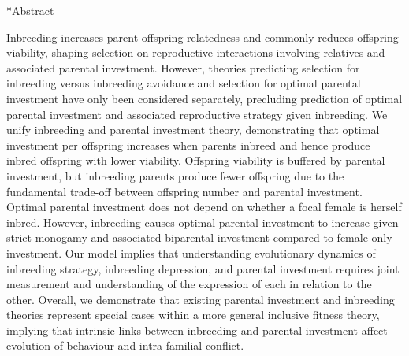 \documentclass[12pt]{article}
\makeatletter
\renewcommand\section{\@startsection{section}{1}{0in}{-0.5\baselineskip}{0.1\baselineskip}{\normalfont\large\bfseries}}
\makeatother
\begin{document}
\section*{Abstract} 

Inbreeding increases parent-offspring relatedness and commonly reduces offspring viability, shaping selection on reproductive interactions involving relatives and associated parental investment. However, theories predicting selection for inbreeding versus inbreeding avoidance and selection for optimal parental investment have only been considered separately, precluding prediction of optimal parental investment and associated reproductive strategy given inbreeding. We unify inbreeding and parental investment theory, demonstrating that optimal investment per offspring increases when parents inbreed and hence produce inbred offspring with lower viability. Offspring viability is buffered by parental investment, but inbreeding parents produce fewer offspring due to the fundamental trade-off between offspring number and parental investment. Optimal parental investment does not depend on whether a focal female is herself inbred. However, inbreeding causes optimal parental investment to increase given strict monogamy and associated biparental investment compared to female-only investment. Our model implies that understanding evolutionary dynamics of inbreeding strategy, inbreeding depression, and parental investment requires joint measurement and understanding of the expression of each in relation to the other. Overall, we demonstrate that existing parental investment and inbreeding theories represent special cases within a more general inclusive fitness theory, implying that intrinsic links between inbreeding and parental investment affect evolution of behaviour and intra-familial conflict.
\end{document}
